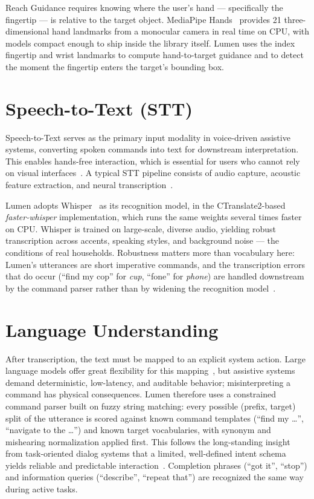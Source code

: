 Reach Guidance requires knowing where the user's hand --- specifically the fingertip
--- is relative to the target object. MediaPipe Hands~\cite{zhang2020mediapipe}
provides 21 three-dimensional hand landmarks from a monocular camera in real time on
CPU, with models compact enough to ship inside the library itself. Lumen uses the
index fingertip and wrist landmarks to compute hand-to-target guidance and to detect
the moment the fingertip enters the target's bounding box.

\section{Speech-to-Text (STT)}

Speech-to-Text serves as the primary input modality in voice-driven assistive
systems, converting spoken commands into text for downstream interpretation. This
enables hands-free interaction, which is essential for users who cannot rely on
visual interfaces~\cite{graves2013speech}. A typical STT pipeline consists of audio
capture, acoustic feature extraction, and neural
transcription~\cite{hinton2012deep}.

Lumen adopts Whisper~\cite{radford2022whisper} as its recognition model, in the
CTranslate2-based \emph{faster-whisper} implementation, which runs the same weights
several times faster on CPU. Whisper is trained on large-scale, diverse audio,
yielding robust transcription across accents, speaking styles, and background noise
--- the conditions of real households. Robustness matters more than vocabulary here:
Lumen's utterances are short imperative commands, and the transcription errors that
do occur (``find my cop'' for \emph{cup}, ``fone'' for \emph{phone}) are handled
downstream by the command parser rather than by widening the recognition
model~\cite{li2017robust}.

\section{Language Understanding}
\label{sec:command_parsing}

After transcription, the text must be mapped to an explicit system action. Large
language models offer great flexibility for this mapping~\cite{brown2020language},
but assistive systems demand deterministic, low-latency, and auditable behavior;
misinterpreting a command has physical consequences. Lumen therefore uses a
constrained command parser built on fuzzy string matching: every possible
(prefix, target) split of the utterance is scored against known command templates
(``find my \ldots'', ``navigate to the \ldots'') and known target vocabularies, with
synonym and mishearing normalization applied first. This follows the long-standing
insight from task-oriented dialog systems that a limited, well-defined intent
schema yields reliable and predictable interaction~\cite{tur2011spoken,
williams2013dialog}. Completion phrases (``got it'', ``stop'') and information
queries (``describe'', ``repeat that'') are recognized the same way during active
tasks.

